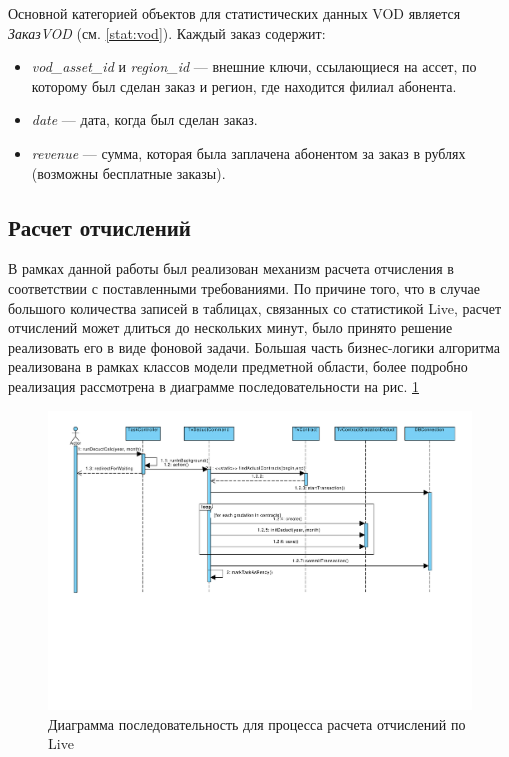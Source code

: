 Основной категорией объектов для статистических данных VOD является \textit{ЗаказVOD} (см. \ref{stat:vod}).
Каждый заказ содержит:
\begin{itemize}
\item{
  \textit{vod\_asset\_id} и \textit{region\_id} --- внешние ключи, ссылающиеся на ассет, по которому был сделан
заказ и регион, где находится филиал абонента.
}
\item{
  \textit{date} --- дата, когда был сделан заказ.
}
\item{
  \textit{revenue} --- сумма, которая была заплачена абонентом за заказ в рублях (возможны бесплатные заказы).
}
\end{itemize}

\subsection{Расчет отчислений}
В рамках данной работы был реализован механизм расчета отчисления в соответствии с поставленными требованиями.
По причине того, что в случае большого количества записей в таблицах, связанных со статистикой Live, расчет отчислений
может длиться до нескольких минут, было принято решение реализовать его в виде фоновой задачи.
Большая часть бизнес-логики алгоритма реализована в рамках классов модели предметной области, более подробно реализация
рассмотрена в диаграмме последовательности на рис. \ref{gr:calc_deduct}

\begin{figure}[!ht]
\begin{center}
\vspace{-0.4cm}
\includegraphics[scale=0.65, trim=10mm 80mm 0mm 10mm, clip]{../resources/uml/CalcDeduct.pdf}
\caption{Диаграмма последовательность для процесса расчета отчислений по Live}
\label{gr:calc_deduct}
\end{center} 
\end{figure}


